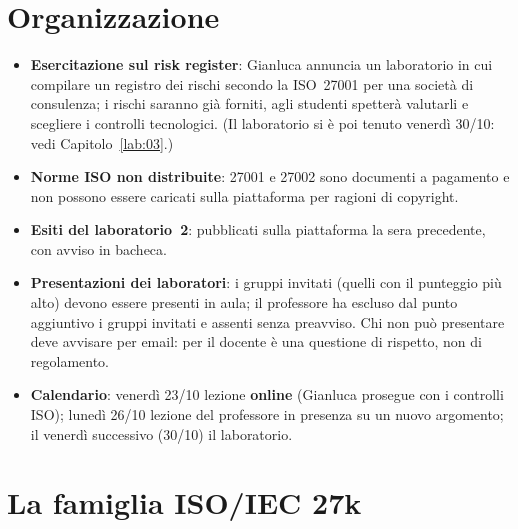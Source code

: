 \section{Organizzazione}
\begin{itemize}
  \item \textbf{Esercitazione sul risk register}: Gianluca annuncia un laboratorio in cui compilare un
    registro dei rischi secondo la ISO~27001 per una società di consulenza; i rischi saranno già forniti,
    agli studenti spetterà valutarli e scegliere i controlli tecnologici. (Il laboratorio si è poi tenuto
    venerdì 30/10: vedi Capitolo~\ref{lab:03}.)
  \item \textbf{Norme ISO non distribuite}: 27001 e 27002 sono documenti a pagamento e non possono essere
    caricati sulla piattaforma per ragioni di copyright.
  \item \textbf{Esiti del laboratorio~2}: pubblicati sulla piattaforma la sera precedente, con avviso in
    bacheca.
  \item \textbf{Presentazioni dei laboratori}: i gruppi invitati (quelli con il punteggio più alto)
    devono essere presenti in aula; il professore ha escluso dal punto aggiuntivo i gruppi invitati e
    assenti senza preavviso. Chi non può presentare deve avvisare per email: per il docente è una
    questione di rispetto, non di regolamento.
  \item \textbf{Calendario}: venerdì 23/10 lezione \textbf{online} (Gianluca prosegue con i controlli
    ISO); lunedì 26/10 lezione del professore in presenza su un nuovo argomento; il venerdì successivo
    (30/10) il laboratorio.
\end{itemize}

\section{La famiglia ISO/IEC 27k}


